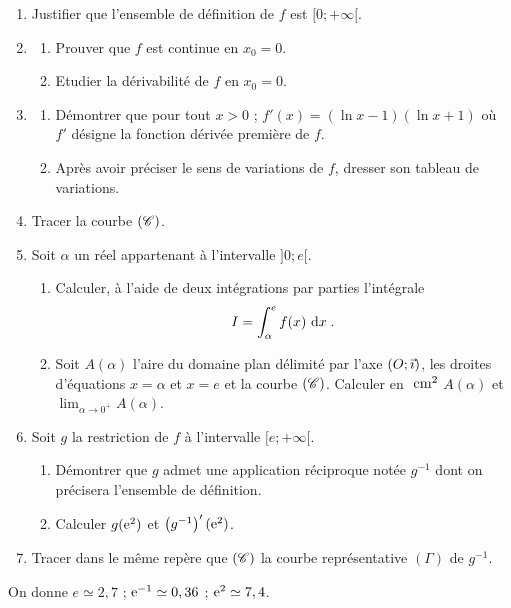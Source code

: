       \begin{enumerate}
            \item Justifier que l'ensemble de d\'efinition de $f$ est $[0;+\infty[$.
            \item \begin{enumerate}
                        \item Prouver que $f$ est continue en $x_0 = 0$.
                        \item Etudier la d\'erivabilit\'e de $f$ en $x_0 = 0$.
                  \end{enumerate}
            \item \begin{enumerate}
                        \item D\'emontrer que pour tout $x>0$ ; $f'(x) = (\ln x - 1) (\ln x + 1)$ o\`u $f'$ d\'esigne la fonction
                              d\'eriv\'ee premi\`ere de $f$.
                        \item Apr\`es avoir pr\'eciser le sens de variations de $f$, dresser son tableau de variations.
                  \end{enumerate}
            \item Tracer la courbe $(\mathscr{C})$.
            \item Soit $\alpha$ un r\'eel appartenant \`a l'intervalle $]0;e[$.
                  \begin{enumerate}
                        \item Calculer, \`a l'aide de deux int\'egrations par parties l'int\'egrale 
                              \[
                                    I = \int_{\alpha}^{e} f(x) ~\mathrm{d}x \;.
                              \]
                        \item Soit $A(\alpha)$ l'aire du domaine plan d\'elimit\'e par l'axe $(O;\vec{\imath})$,
                              les droites d'\'equations $x = \alpha$ et $x = e$ et la courbe $(\mathscr{C})$.
                              Calculer en $~\mathrm{cm}^2$ $A(\alpha)$ et $\displaystyle{\lim_{\alpha \rightarrow 0^+} A(\alpha)}$.
                  \end{enumerate}
            \item Soit $g$ la restriction de $f$ \`a l'intervalle $[e;+\infty[$.
                  \begin{enumerate}
                        \item D\'emontrer que $g$ admet une application r\'eciproque not\'ee $g^{-1}$ dont on pr\'ecisera
                              l'ensemble de d\'efinition.
                        \item Calculer $g(\mathrm{e}^{2})$ et $\left( g^{-1} \right)' (\mathrm{e}^{2})$.
                  \end{enumerate}
            \item Tracer dans le m\^eme rep\`ere que $(\mathscr{C})$ la courbe repr\'esentative $(\Gamma)$ de $g^{-1}$.
      \end{enumerate}
            On donne $e \simeq 2,7$ ; $\mathrm{e}^{-1} \simeq 0,36$ ; $\mathrm{e}^{2} \simeq 7,4$.











